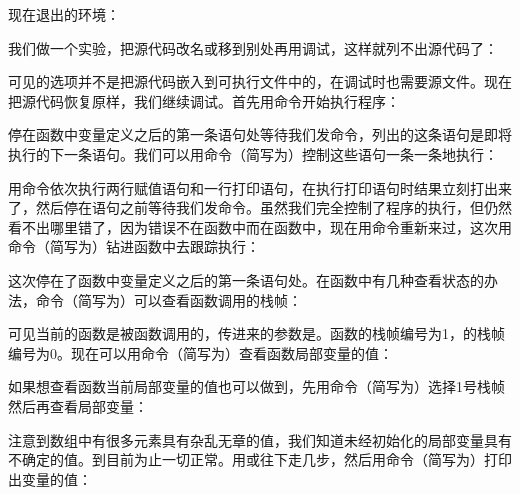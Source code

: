 现在退出的环境：




我们做一个实验，把源代码改名或移到别处再用调试，这样就列不出源代码了：




可见的选项并不是把源代码嵌入到可执行文件中的，在调试时也需要源文件。现在把源代码恢复原样，我们继续调试。首先用命令开始执行程序：




停在函数中变量定义之后的第一条语句处等待我们发命令，列出的这条语句是即将执行的下一条语句。我们可以用命令（简写为）控制这些语句一条一条地执行：




用命令依次执行两行赋值语句和一行打印语句，在执行打印语句时结果立刻打出来了，然后停在语句之前等待我们发命令。虽然我们完全控制了程序的执行，但仍然看不出哪里错了，因为错误不在函数中而在函数中，现在用命令重新来过，这次用命令（简写为）钻进函数中去跟踪执行：




这次停在了函数中变量定义之后的第一条语句处。在函数中有几种查看状态的办法，命令（简写为）可以查看函数调用的栈帧：




可见当前的函数是被函数调用的，传进来的参数是。函数的栈帧编号为1，的栈帧编号为0。现在可以用命令（简写为）查看函数局部变量的值：




如果想查看函数当前局部变量的值也可以做到，先用命令（简写为）选择1号栈帧然后再查看局部变量：




注意到数组中有很多元素具有杂乱无章的值，我们知道未经初始化的局部变量具有不确定的值。到目前为止一切正常。用或往下走几步，然后用命令（简写为）打印出变量的值：


